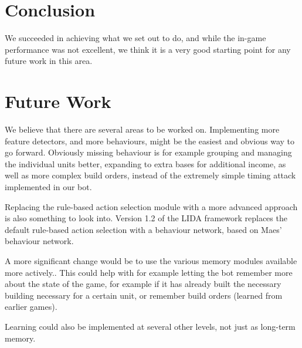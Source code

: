 \section{Conclusion}
\label{sec:conclusion}
We succeeded in achieving what we set out to do, and while the in-game performance was not excellent, we think it is a very good starting point for any future work in this area.

\section{Future Work}
\label{sec:futurework}
We believe that there are several areas to be worked on. Implementing more feature detectors, and more behaviours, might be the easiest and obvious way to go forward. Obviously missing behaviour is for example grouping and managing the individual units better, expanding to extra bases for additional income, as well as more complex build orders, instead of the extremely simple timing attack implemented in our bot.

Replacing the rule-based action selection module with a more advanced approach is also something to look into. Version 1.2 of the LIDA framework replaces the default rule-based action selection with a behaviour network, based on Maes' behaviour network.\cite{maes1989right}

A more significant change would be to use the various memory modules available more actively.\cite{franklin2007lida}. This could help with for example letting the bot remember more about the state of the game, for example if it has already built the necessary building necessary for a certain unit, or remember build orders (learned from earlier games).

Learning could also be implemented at several other levels, not just as long-term memory.
